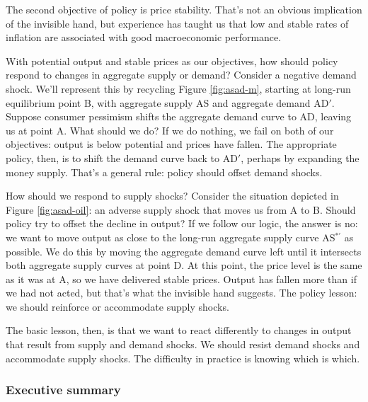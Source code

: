 \documentclass[letterpaper,12pt]{article}
\begin{document}
The second objective of policy is price stability.
That's not an obvious implication of the invisible hand, 
but experience has taught us that low and stable rates of 
inflation are associated with good macroeconomic performance.


With potential output and stable prices as our objectives, 
how should policy respond to changes in aggregate supply or demand?  
Consider a negative demand shock. 
We'll represent this by recycling Figure \ref{fig:asad-m}, 
starting at long-run equilibrium point B, 
with aggregate supply AS and aggregate demand AD$'$.
Suppose consumer pessimism shifts the aggregate demand curve 
to AD, leaving us at point A.  
What should we do? 
If we do nothing, we fail on both of our objectives: 
output is below potential and prices have fallen.  
The appropriate policy, then, is to shift the demand curve 
back to AD$'$, perhaps by expanding the money supply.  
That's a general rule:  policy should offset demand shocks.  


How should we respond to supply shocks?
Consider the situation depicted in Figure \ref{fig:asad-oil}:
an adverse supply shock that moves us from A to B.
Should policy try to offset the decline in output? 
If we follow our logic, the answer is no:
we want to move output as close to the long-run aggregate supply 
curve AS$^{*\prime}$ as possible.  
We do this by moving the aggregate demand curve left until it intersects 
both aggregate supply curves at point D.
At this point, the price level is the same as it was at A, 
so we have delivered stable prices.  
Output has fallen more than if we had not acted, 
but that's what the invisible hand suggests.
The policy lesson:  we should reinforce or accommodate
supply shocks.

The basic lesson, then, is that we want to react differently to 
changes in output that result from supply and demand shocks.
We should resist demand shocks and accommodate supply shocks.  
The difficulty in practice is knowing which is which.  

 

\subsubsection*{Executive summary}
\end{document}
